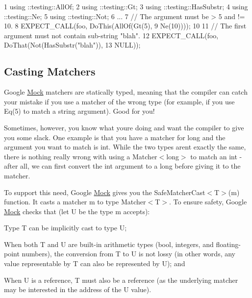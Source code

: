 \begin{DoxyCode}
1 using ::testing::AllOf;
2 using ::testing::Gt;
3 using ::testing::HasSubstr;
4 using ::testing::Ne;
5 using ::testing::Not;
6 ...
7   // The argument must be > 5 and != 10.
8   EXPECT\_CALL(foo, DoThis(AllOf(Gt(5),
9                                 Ne(10))));
10 
11   // The first argument must not contain sub-string "blah".
12   EXPECT\_CALL(foo, DoThat(Not(HasSubstr("blah")),
13                           NULL));
\end{DoxyCode}


\subsection*{Casting Matchers}

Google \hyperlink{class_mock}{Mock} matchers are statically typed, meaning that the compiler can catch your mistake if you use a matcher of the wrong type (for example, if you use {\ttfamily Eq(5)} to match a {\ttfamily string} argument). Good for you!

Sometimes, however, you know what you\textquotesingle{}re doing and want the compiler to give you some slack. One example is that you have a matcher for {\ttfamily long} and the argument you want to match is {\ttfamily int}. While the two types aren\textquotesingle{}t exactly the same, there is nothing really wrong with using a {\ttfamily Matcher$<$long$>$} to match an {\ttfamily int} -\/ after all, we can first convert the {\ttfamily int} argument to a {\ttfamily long} before giving it to the matcher.

To support this need, Google \hyperlink{class_mock}{Mock} gives you the {\ttfamily Safe\+Matcher\+Cast$<$T$>$(m)} function. It casts a matcher {\ttfamily m} to type {\ttfamily Matcher$<$T$>$}. To ensure safety, Google \hyperlink{class_mock}{Mock} checks that (let {\ttfamily U} be the type {\ttfamily m} accepts)\+:


\begin{DoxyEnumerate}
\item Type {\ttfamily T} can be implicitly cast to type {\ttfamily U};
\end{DoxyEnumerate}
\begin{DoxyEnumerate}
\item When both {\ttfamily T} and {\ttfamily U} are built-\/in arithmetic types ({\ttfamily bool}, integers, and floating-\/point numbers), the conversion from {\ttfamily T} to {\ttfamily U} is not lossy (in other words, any value representable by {\ttfamily T} can also be represented by {\ttfamily U}); and
\end{DoxyEnumerate}
\begin{DoxyEnumerate}
\item When {\ttfamily U} is a reference, {\ttfamily T} must also be a reference (as the underlying matcher may be interested in the address of the {\ttfamily U} value).
\end{DoxyEnumerate}

